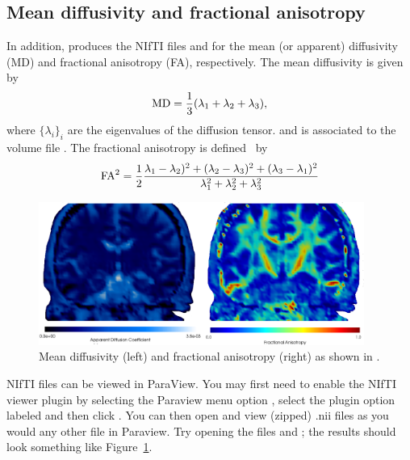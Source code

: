 \subsection{Mean diffusivity and fractional anisotropy}

In addition,  produces the NIfTI files
 and  for the mean (or apparent)
diffusivity (MD) and fractional anisotropy (FA), respectively. 
The mean diffusivity is given by 
\begin{equation}
  \rm{MD} = \frac{1}{3}(\lambda_1 + \lambda_2 + \lambda_3),   
\end{equation}
where $\{\lambda_i\}_i$ are the eigenvalues of the diffusion tensor.
and is associated to the volume file . The fractional
anisotropy is defined~\cite{kindlmann2007geodesic} by
\begin{equation}
\rm{FA}^2 = \frac{1}{2} \frac{\lambda_1-\lambda_2)^2 
+ (\lambda_2 - \lambda_3)^2 + (\lambda_3 - \lambda_1)^2}{\lambda_1^2 
+ \lambda_2^2 + \lambda_3^2} 
\end{equation}

\begin{figure}	
  \begin{center}
    \includegraphics[width=0.95\textwidth]{./chapters/chp5/FIG/paraview_adcfa.png}
  \end{center}
  \caption{Mean diffusivity (left) and fractional anisotropy (right) as shown in .}
  \label{fig:chp5:DTIfa}
\end{figure}
NIfTI files can be viewed in ParaView. You may first need to enable
the NIfTI viewer plugin by selecting the Paraview menu option
, select the plugin option labeled
 and then click .  You
can then open and view (zipped) .nii files as you would any other
file in Paraview. Try opening the files  and
; the results should look something like
Figure~\ref{fig:chp5:DTIfa}.

